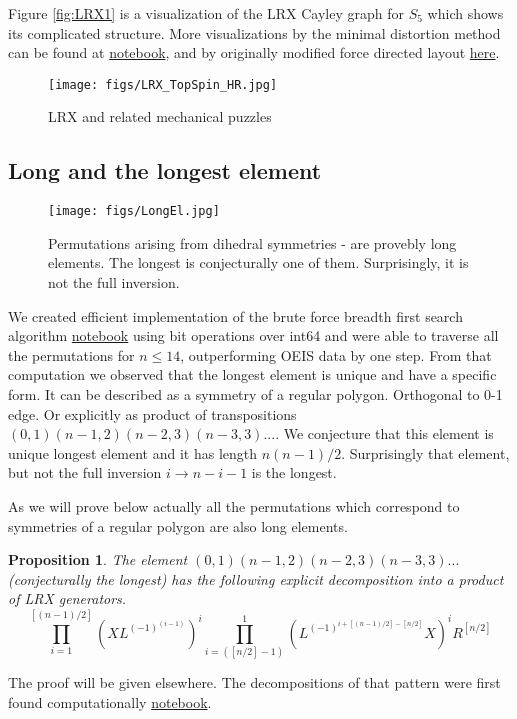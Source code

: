 \documentclass[atmp]{ipart_v1}
\numberwithin{equation}{section}
\theoremstyle{plain}%
\newtheorem{proposition}[theorem]{Proposition}
\begin{document}
Figure \ref{fig:LRX1} is a visualization of the LRX Cayley graph for $S_5$ which shows its complicated structure. More visualizations by the minimal distortion method  can be found at \href{https://www.kaggle.com/code/iggisv9t/drawing-cayley-graphs-with-mds}{notebook}, and by originally modified force directed layout \href{https://projects.interacta.io/graphs/IM_S_N_4.csv}{here}.

\begin{figure}[h!]
 \centering
 \texttt{[image: figs/LRX\_TopSpin\_HR.jpg]}
 \caption{LRX and related mechanical puzzles}\label{fig:LRX_TopSpin_HR}
\end{figure}


\subsection{Long and the longest element}

\begin{figure}[h!]
 \centering
 \texttt{[image: figs/LongEl.jpg]}
 \caption{Permutations arising from dihedral symmetries - are provebly long elements. The longest is conjecturally one of them. Surprisingly, it is not the full inversion.}\label{fig:LongEl}
\end{figure}

We created efficient implementation of the brute force breadth first search algorithm \href{https://www.kaggle.com/code/ivankolt/lrx-4bit-uint64}{notebook} using bit operations over int64 and were able to traverse all the permutations for $n \le 14$, outperforming OEIS data by one step. From that computation we observed that the longest element is unique and have a specific form. It can be described as a symmetry of a regular polygon. Orthogonal to 0-1 edge. Or explicitly as product of transpositions $(0,1)(n-1,2)(n-2,3)(n-3,3)...$. We conjecture that this element is unique longest element and it has length $n(n-1)/2$. 
Surprisingly that element, but not the full inversion $i\to n-i-1$ is the longest. 

As we will prove below actually all the permutations which correspond to symmetries of a regular polygon are also long elements.  


\begin{proposition}
  The element $(0,1)(n-1,2)(n-2,3)(n-3,3)...$ (conjecturally the longest)
  has the following explicit decomposition into a product of LRX generators.
\begin{equation}
\label{eq:long}
\prod_{i=1}^{[ (n-1)/2]} ( X L^{(-1)^{(i-1)}} )^i 
\prod_{i=([ n/2]-1)}^{1} (L^{(-1)^{i+[(n-1)/2] - [n/2] }} X )^i R^{[n/2]}
\end{equation}  
\end{proposition}
The proof will be given elsewhere. The decompositions of that pattern were first found computationally \href{https://www.kaggle.com/code/luxoove/lrx-optimal-algorithm-two-ways-bubble-sort}{notebook}.
\end{document}
